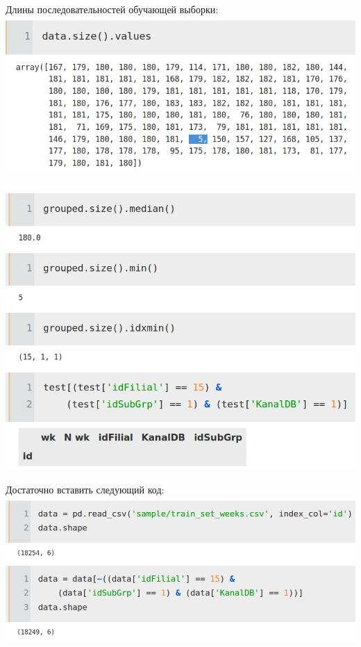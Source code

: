 \documentclass[russian, 10pt]{beamer}
\begin{document}
\begin{frame}
Длины последовательностей обучающей выборки:
\includegraphics[scale=0.4]{images/6.png}
\end{frame}

\begin{frame}

\includegraphics[scale=0.4]{images/7.png}
\end{frame}

\begin{frame}
Достаточно вставить следующий код:
\includegraphics[scale=0.35]{images/8.png}
\end{frame}
\end{document}

